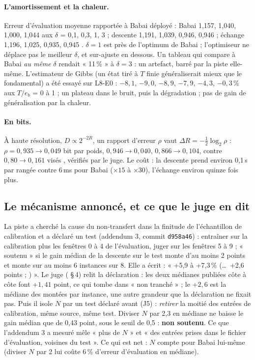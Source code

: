 \paragraph{L'amortissement et la chaleur.} Erreur d'évaluation moyenne rapportée à Babai déployé : Babai 1,157, 1,040, 1,000, 1,044 aux $\delta$ = 0,1, 0,3, 1, 3 ; descente 1,191, 1,039, 0,946, 0,946 ; échange 1,196, 1,025, 0,935, 0,945 \mes. $\delta = 1$ est près de l'optimum de Babai ; l'optimiseur ne déplace pas le meilleur $\delta$, et sur-ajuste en dessous. Un tableau qui compare à Babai \emph{au même} $\delta$ rendait « 11\,\% » à $\delta = 3$ : un artefact, barré par la piste elle-même. L'estimateur de Gibbs (un état tiré à $T$ finie généraliserait mieux que le fondamental) a été essayé sur L8-E0 : $-8{,}1$, $-9{,}0$, $-8{,}9$, $-7{,}9$, $-4{,}3$, $-0{,}3\,\%$ aux $T/e_b$ = 0 à 1 ; un plateau dans le bruit, puis la dégradation ; pas de gain de généralisation par la chaleur.

\paragraph{En bits.} À haute résolution, $D \propto 2^{-2R}$, un rapport d'erreur $\rho$ vaut $\Delta R = -\tfrac12 \log_2 \rho$ : $\rho = 0{,}935 \to 0{,}049$ bit par poids, $0{,}946 \to 0{,}040$, $0{,}866 \to 0{,}104$, contre $0{,}80 \to 0{,}161$ visés \calc, vérifiés par le juge. Le coût : la descente prend environ 0,1\,s par rangée contre 6\,ms pour Babai ($\times 15$ à $\times 30$), l'échange environ quinze fois plus.

\subsection{Le mécanisme annoncé, et ce que le juge en dit}\label{t3mim:sec:p5-juge}

La piste a cherché la cause du non-transfert dans la finitude de l'échantillon de calibration et a déclaré un test (addendum 3, commit \texttt{d958a46}) : entraîner sur la calibration plus les fenêtres 0 à 4 de l'évaluation, juger sur les fenêtres 5 à 9 ; « soutenu » si le gain médian de la descente sur le test monte d'au moins 2 points et monte sur au moins 6 instances sur 8. Elle a écrit : « +5,9 à +7,3\,\% (\dots\ +2,6 points ; ) ». Le juge ( §\,4) relit la déclaration : les deux médianes publiées côte à côte font $+1{,}41$ point, ce qui tombe dans « non tranché » ; le $+2{,}6$ est la médiane des montées par instance, une autre grandeur que la déclaration ne fixait pas. Puis il isole $N$ par un test déclaré avant (J5) : \emph{retirer} la moitié des entrées de calibration, même source, même test. Diviser $N$ par 2,3 en médiane ne baisse le gain médian que de 0,43 point, sous le seuil de 0,5 : \textbf{non soutenu}. Ce que l'addendum 3 a mesuré mêle « plus de $N$ » et « des entrées prises dans le fichier d'évaluation, voisines du test ». Ce qui est net : $N$ compte pour Babai lui-même (diviser $N$ par 2 lui coûte 6\,\% d'erreur d'évaluation en médiane).

